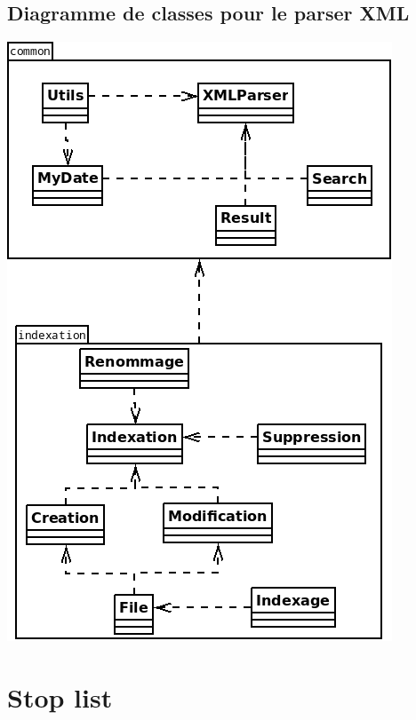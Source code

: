 \subsection{Diagramme de classes pour le parser XML}
\begin{center}
\includegraphics[scale=0.6]{"images/diagramme_classes_xmlparser"}
\end{center}

\newpage

\section{Stop list}\label{stop_list}

\newpage
